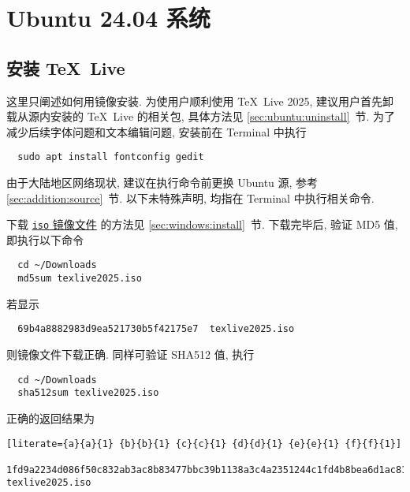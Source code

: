
\chapter{Ubuntu 24.04 系统}

\section{安装 \TeX~Live}\label{chap:ubuntu:sec:install}

这里只阐述如何用镜像安装.
为使用户顺利使用 \TeX~Live 2025,
建议用户首先卸载从源内安装的 \TeX~Live 的相关包,
具体方法见 \ref{sec:ubuntu:uninstall}~节.
为了减少后续字体问题和文本编辑问题,
安装前在 \textsf{Terminal} 中执行
\begin{lstlisting}
  sudo apt install fontconfig gedit
\end{lstlisting}
由于大陆地区网络现状,
建议在执行命令前更换 Ubuntu 源,
参考 \ref{sec:addition:source}~节.
以下未特殊声明,
均指在  \textsf{Terminal} 中执行相关命令.

下载
\href{https://mirrors.ctan.org/systems/texlive/Images/texlive2025.iso}{\texttt{iso} 镜像文件}
的方法见 \ref{sec:windows:install}~节.
下载完毕后,
验证 MD5 值,
即执行以下命令
\begin{lstlisting}
  cd ~/Downloads
  md5sum texlive2025.iso
\end{lstlisting}
若显示
\begin{lstlisting}
  69b4a8882983d9ea521730b5f42175e7  texlive2025.iso
\end{lstlisting}
则镜像文件下载正确.
同样可验证 SHA512 值,
执行
\begin{lstlisting}
  cd ~/Downloads
  sha512sum texlive2025.iso
\end{lstlisting}
正确的返回结果为
\begin{lstlisting}[literate={a}{a}{1} {b}{b}{1} {c}{c}{1} {d}{d}{1} {e}{e}{1} {f}{f}{1}]
  1fd9a2234d086f50c832ab3ac8b83477bbc39b1138a3c4a2351244c1fd4b8bea6d1ac81d4a5b0cba95f2e82c00f0d9df5b33189eb222e4bae5dae1523ef0da0e  texlive2025.iso
\end{lstlisting}

